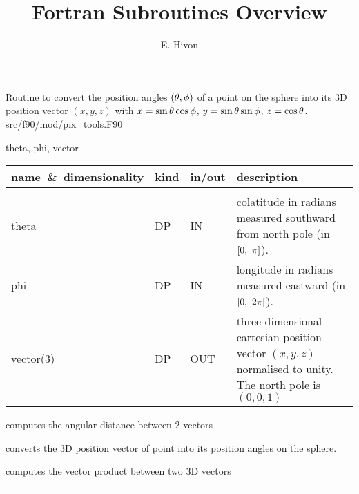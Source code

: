 

\sloppy


\title{\healpix Fortran Subroutines Overview}
 \section[ang2vec]{ }
\label{sub:ang2vec}
\author{E. Hivon}

\begin{facility}
{Routine to convert the position angles $(\theta,\phi)$ of a point on the sphere 
into its 3D position vector $(x,y,z)$ with
$x = \sin\theta\cos\phi$, $y=\sin\theta\sin\phi$, $z=\cos\theta$. 
}
{src/f90/mod/pix\_tools.F90}
\end{facility}

\begin{f90format}
{theta, phi, vector}
\end{f90format}


\begin{arguments}
{
\begin{tabular}{p{0.3\hsize} p{0.05\hsize} p{0.1\hsize} p{0.45\hsize}} \hline  
\textbf{name~\&~dimensionality} & \textbf{kind} & \textbf{in/out} & \textbf{description} \\ \hline
                   &   &   &                           \\ %
theta & DP & IN & colatitude in radians measured southward from north pole (in
    $[0,\ \pi]\myhtmlimage{}$). \\
phi   & DP & IN & longitude in radians measured eastward (in $[0,\ 2\pi]$).\\
vector(3) & DP & OUT & three dimensional cartesian position vector
                   $(x,y,z)$ normalised to unity. The north pole is $(0,0,1)$
\end{tabular}
}
\end{arguments}


\begin{related}
  \begin{sulist}{} %
  \item[\htmlref{angdist}{sub:angdist}] computes the angular distance between 2 vectors
  \item[\htmlref{vec2ang}{sub:vec2ang}] converts the 3D position vector of point into its position
  angles on the sphere.
  \item[\htmlref{vect\_prod}{sub:vect_prod}] computes the vector product between two 3D vectors
  \end{sulist}
\end{related}

\rule{\hsize}{2mm}

